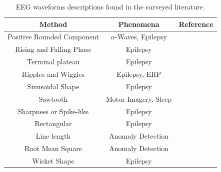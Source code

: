 \documentclass[brainsci,article,submit,moreauthors,pdftex,10pt,a4paper]{mdpi}
\begin{document}
%




\begin{table}[H]
\caption{EEG waveforms descriptions found in the surveyed literature.}
\centering
\begin{tabular}{ccc}
\toprule
\textbf{Method}	& \textbf{Phenomena} & \textbf{Reference}	\\
\midrule
Positive Rounded Component                    & $\alpha$-Waves, Epilepsy & \citep{Schomer2010,Tatum2008} \\
Rising and Falling Phase      & Epilepsy &  \citep{Thakor2004,Tatum2008} \\
Terminal plateau      & Epilepsy &  \citep{Thakor2004} \\
Ripples and Wiggles     & Epilepsy, ERP &  \citep{EEGIntro, Thakor2004,Cacioppo2007,Kappenman2012} \\
Sinusoidal Shape        & Epilepsy &  \citep{Cacioppo2007,Tatum2008,Ouyang2017,Kappenman2012,Cole2017} \\
Sawtooth                     & Motor Imagery, Sleep &  \citep{EEGIntro,Rodenbeck2006,Tatum2008} \\
Sharpness or Spike-like     & Epilepsy &  \citep{Thakor2004,Hartman2005,Sanei2007,EEGIntro} \\
Rectangular     & Epilepsy &  \citep{Thakor2004,Cole2017} \\
Line length       & Anomaly Detection & \citep{Wulsin2011} \\
Root Mean Square & Anomaly Detection & \citep{Wulsin2011} \\
Wicket Shape     & Epilepsy &  \citep{EEGIntro,Hartman2005,Sanei2007,Tatum2008,Schomer2010,Cole2017} \\

\end{tabular}
\end{table}
\end{document}
